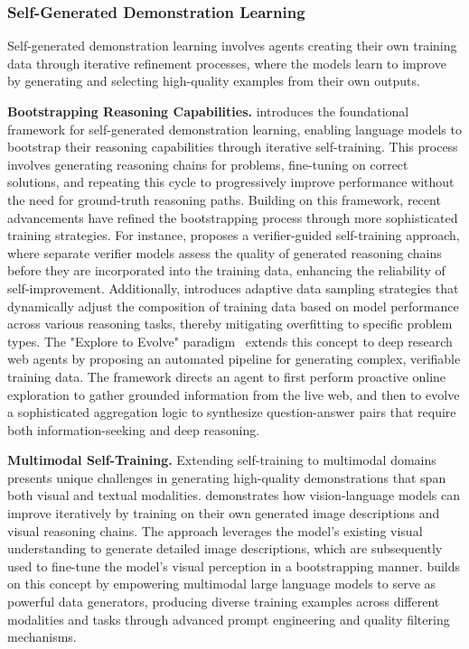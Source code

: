 \subsubsection{Self-Generated Demonstration Learning}

Self-generated demonstration learning involves agents creating their own training data through iterative refinement processes, where the models learn to improve by generating and selecting high-quality examples from their own outputs.

\textbf{Bootstrapping Reasoning Capabilities.} 
\cite{zelikman2022star} introduces the foundational framework for self-generated demonstration learning, enabling language models to bootstrap their reasoning capabilities through iterative self-training. This process involves generating reasoning chains for problems, fine-tuning on correct solutions, and repeating this cycle to progressively improve performance without the need for ground-truth reasoning paths. Building on this framework, recent advancements have refined the bootstrapping process through more sophisticated training strategies. For instance, \cite{hosseini2024v} proposes a verifier-guided self-training approach, where separate verifier models assess the quality of generated reasoning chains before they are incorporated into the training data, enhancing the reliability of self-improvement. Additionally, \cite{koh2025adastar} introduces adaptive data sampling strategies that dynamically adjust the composition of training data based on model performance across various reasoning tasks, thereby mitigating overfitting to specific problem types. The "Explore to Evolve" paradigm~\citep{wang2025exploretoevolve} extends this concept to deep research web agents by proposing an automated pipeline for generating complex, verifiable training data. The framework directs an agent to first perform proactive online exploration to gather grounded information from the live web, and then to evolve a sophisticated aggregation logic to synthesize question-answer pairs that require both information-seeking and deep reasoning.

\textbf{Multimodal Self-Training.} 
Extending self-training to multimodal domains presents unique challenges in generating high-quality demonstrations that span both visual and textual modalities. \cite{deng2024enhancing} demonstrates how vision-language models can improve iteratively by training on their own generated image descriptions and visual reasoning chains. The approach leverages the model’s existing visual understanding to generate detailed image descriptions, which are subsequently used to fine-tune the model’s visual perception in a bootstrapping manner. \cite{zhao2024genixer} builds on this concept by empowering multimodal large language models to serve as powerful data generators, producing diverse training examples across different modalities and tasks through advanced prompt engineering and quality filtering mechanisms.


